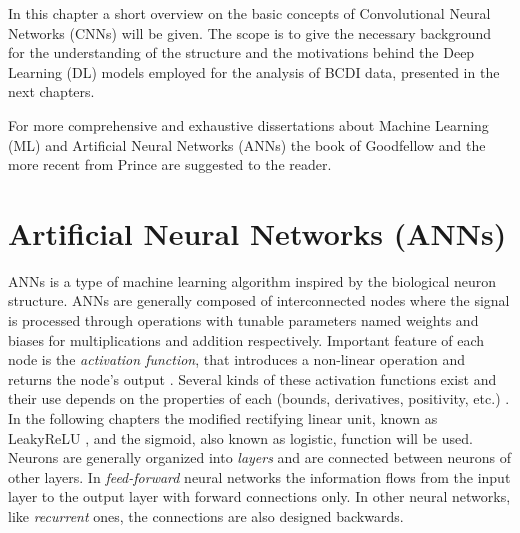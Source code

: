 

In this chapter a short overview on the basic concepts of Convolutional Neural Networks (CNNs) will be given. 
The scope is to give the necessary background for the understanding of the structure and the motivations behind the 
Deep Learning (DL) models employed for the analysis of BCDI data, presented in the next chapters.  

For more comprehensive and exhaustive dissertations about Machine Learning (ML) and Artificial Neural Networks (ANNs)
the book of Goodfellow \cite{Goodfellow_2016} and the more recent from Prince \cite{prince2023understanding} are 
suggested to the reader. 

\section{Artificial Neural Networks (ANNs)}

ANNs is a type of machine learning algorithm inspired by the biological neuron structure. ANNs are generally composed of interconnected 
nodes where the signal is processed through operations with tunable parameters named weights 
and biases for multiplications and addition respectively. Important feature of each node is the \textit{activation function}, 
that introduces a non-linear operation and returns the node's output \cite{jagtap2022}. Several kinds of these 
activation functions exist and their use depends on the properties of each (bounds, derivatives, positivity, etc.) 
\cite{kunc2024}. In the following chapters the modified rectifying linear unit, known as LeakyReLU \cite{Maas2013RectifierNI}, 
and the sigmoid, also known as logistic, function will be used. Neurons are generally organized into \textit{layers} and 
are connected between neurons of other layers. In \textit{feed-forward} neural networks the information flows from the 
input layer to the output layer with forward connections only.
In other neural networks, like \textit{recurrent} ones, the connections are also designed backwards. 

